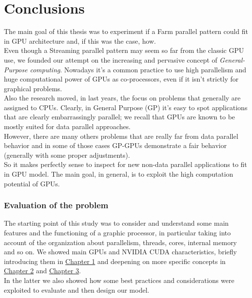 \chapter{Conclusions} \label{chap:conclusions}
\setcounter{section}{1}
The main goal of this thesis was to experiment if a Farm parallel pattern could fit in GPU architecture and, if this was the case, how.\\
Even though a Streaming parallel pattern may seem so far from the classic GPU use, we founded our attempt on the increasing and pervasive concept of \textit{General-Purpose computing}.
Nowadays it's a common practice to use high parallelism and huge computational power of GPUs as co-processors, even if it isn't strictly for graphical problems.\\
Also the research moved, in last years, the focus on problems that generally are assigned to CPUs. Clearly, in General Purpose (GP) it's easy to spot applications that are clearly embarrassingly parallel; we recall that GPUs are known to be mostly suited for data parallel approaches.\\
However, there are many others problems that are really far from data parallel behavior and in some of those cases GP-GPUs demonstrate a fair behavior (generally with some proper adjustments).\\
So it makes perfectly sense to inspect for new non-data parallel applications to fit in GPU model. The main goal, in general, is to exploit the high computation potential of GPUs.


\subsection{Evaluation of the problem}
The starting point of this study was to consider and understand some main features and the functioning of a graphic processor, in particular taking into account of the organization about parallelism, threads, cores, internal memory and so on. We showed main GPUs and NVIDIA CUDA characteristics, briefly introducing them in \hyperref[chap:into]{Chapter 1} and deepening on more specific concepts in \hyperref[chap:tools]{Chapter 2} and \hyperref[chap:logic]{Chapter 3}.\\
In the latter we also showed how some best practices and considerations were exploited to evaluate and then design our model. \\

